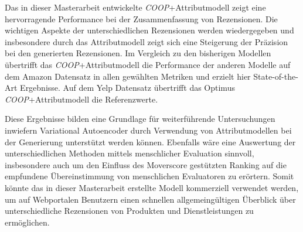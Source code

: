 Das in dieser Masterarbeit entwickelte \textit{COOP}+Attributmodell zeigt eine hervorragende Performance bei der Zusammenfassung von Rezensionen. 
Die wichtigen Aspekte der unterschiedlichen Rezensionen werden wiedergegeben und insbesondere durch das Attributmodell zeigt sich eine Steigerung der Präzision bei den generierten Rezensionen. 
Im Vergleich zu den bisherigen Modellen übertrifft das \textit{COOP}+Attributmodell die Performance der anderen Modelle auf dem Amazon Datensatz in allen gewählten Metriken und erzielt hier State-of-the-Art Ergebnisse.
Auf dem Yelp Datensatz übertrifft das Optimus \textit{COOP}+Attributmodell die Referenzwerte.

Diese Ergebnisse bilden eine Grundlage für weiterführende Untersuchungen inwiefern Variational Autoencoder durch Verwendung von Attributmodellen bei der Generierung unterstützt werden können.
Ebenfalls wäre eine Auswertung der unterschiedlichen Methoden mittels menschlicher Evaluation sinnvoll, insbesondere auch um den Einfluss des Moverscore gestützten Ranking auf die empfundene Übereinstimmung von menschlichen Evaluatoren zu erörtern.
Somit könnte das in dieser Masterarbeit erstellte Modell kommerziell verwendet werden, um auf Webportalen Benutzern einen schnellen allgemeingültigen Überblick über unterschiedliche Rezensionen von Produkten und Dienstleistungen zu ermöglichen.



\pagebreak
